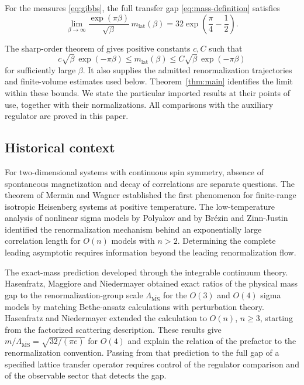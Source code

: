 \begin{theorem}\label{thm:main}
For the measures \eqref{eq:gibbs}, the full transfer gap
\eqref{eq:mass-definition} satisfies
\begin{equation}\label{eq:main-limit}
 \lim_{\beta\to\infty}
    \frac{\exp(\pi\beta)}{\sqrt\beta}\,m_{\mathrm{lat}}(\beta)
       =32\exp\!\left(\frac\pi4-\frac12\right).
\end{equation}
\end{theorem}

The sharp-order theorem of \cite[Theorem~1.1]{SharpO4} gives positive constants \(c,C\)
such that
\begin{equation}\label{eq:sharp-order-input}
 c\sqrt\beta\,\exp(-\pi\beta)
   \leq m_{\mathrm{lat}}(\beta)
   \leq C\sqrt\beta\,\exp(-\pi\beta)
\end{equation}
for sufficiently large \(\beta\). It also supplies the admitted
renormalization trajectories and finite-volume estimates used below.
Theorem~\ref{thm:main} identifies the limit within these bounds. We state the
particular imported results at their points of use, together with their
normalizations. All comparisons with the auxiliary regulator are proved in
this paper.

\subsection{Historical context}

For two-dimensional systems with continuous spin symmetry, absence of
spontaneous magnetization and decay of correlations are separate questions.
The theorem of Mermin and Wagner \cite{MerminWagner1966} established the first
phenomenon for finite-range isotropic Heisenberg systems at positive
temperature. The low-temperature analysis of
nonlinear sigma models by Polyakov \cite{Polyakov1975} and by Br\'ezin and
Zinn-Justin \cite{BrezinZinnJustin1976} identified the renormalization mechanism
behind an exponentially large correlation length for \(O(n)\) models with
\(n>2\). Determining the complete leading asymptotic requires information
beyond the leading renormalization flow.

The exact-mass prediction developed through the integrable continuum
theory. Hasenfratz, Maggiore and Niedermayer
\cite{HasenfratzMaggioreNiedermayer1990} obtained exact ratios of the physical
mass gap to the renormalization-group scale \(\Lambda_{\overline{\mathrm{MS}}}\)
for the \(O(3)\) and \(O(4)\) sigma models by matching Bethe-ansatz calculations
with perturbation theory. Hasenfratz and Niedermayer
\cite{HasenfratzNiedermayer1990} extended the calculation to \(O(n)\),
\(n\geq3\), starting from the factorized scattering description. These
results give \(m/\Lambda_{\overline{\mathrm{MS}}}=\sqrt{32/(\pi e)}\) for
\(O(4)\) and explain the relation of the prefactor to the renormalization
convention. Passing from that prediction to the full gap of
a specified lattice transfer operator requires control of the regulator
comparison and of the observable sector that detects the gap.

